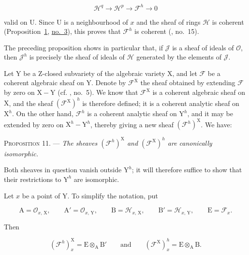 \begin{equation*}
\mathcal{H}^q\longrightarrow\mathcal{H}^p\longrightarrow\mathcal{F}^h\longrightarrow0
\end{equation*}

valid on $\mathrm{U}$. Since $\mathrm{U}$ is a neighbourhood of $x$ and the sheaf of rings $\mathcal{H}$ is coherent (Proposition~\hyperref[gaga:prop:1]{1}, \hyperref[gaga:no:3]{no.~3}), this proves that $\mathcal{F}^h$ is coherent (, no.~15).

The preceding proposition shows in particular that, if $\mathcal{J}$ is a sheaf of ideals of $\mathcal{O}$, then $\mathcal{J}^h$ is precisely the sheaf of ideals of $\mathcal{H}$ generated by the elements of $\mathcal{J}$.


Let $\mathrm{Y}$ be a Z-closed subvariety of the algebraic variety $\mathrm{X}$, and let $\mathcal{F}$ be a coherent algebraic sheaf on $\mathrm{Y}$. Denote by $\mathcal{F}^\mathrm{X}$ the sheaf obtained by extending $\mathcal{F}$ by zero on $\mathrm{X}-\mathrm{Y}$ (cf. , no.~5). We know that $\mathcal{F}^\mathrm{X}$ is a coherent algebraic sheaf on $\mathrm{X}$, and the sheaf $(\mathcal{F}^\mathrm{X})^h$ is therefore defined; it is a coherent analytic sheaf on $\mathrm{X}^h$. On the other hand, $\mathcal{F}^h$ is a coherent analytic sheaf on $\mathrm{Y}^h$, and it may be extended by zero on $\mathrm{X}^h-\mathrm{Y}^h$, thereby giving a new sheaf $(\mathcal{F}^h)^\mathrm{X}$. We have:

\textsc{Proposition 11}. --- \emph{The sheaves $(\mathcal{F}^h)^\mathrm{X}$ and $(\mathcal{F}^\mathrm{X})^h$ are canonically isomorphic.}

Both sheaves in question vanish outside $\mathrm{Y}^h$; it will therefore suffice to show that their restrictions to $\mathrm{Y}^h$ are isomorphic.

Let $x$ be a point of $\mathrm{Y}$. To simplify the notation, put

\begin{equation*}
\mathrm{A}=\mathcal{O}_{x,\,\mathrm{X}},\qquad \mathrm{A}'=\mathcal{O}_{x,\,\mathrm{Y}},\qquad
\mathrm{B}=\mathcal{H}_{x,\,\mathrm{X}},\qquad \mathrm{B}'=\mathcal{H}_{x,\,\mathrm{Y}},\qquad \mathrm{E}=\mathcal{F}_x.
\end{equation*}

Then

\begin{equation*}
(\mathcal{F}^h)^\mathrm{X}_x=\mathrm{E}\otimes_\mathrm{A}\mathrm{B}'
\qquad\text{and}\qquad
(\mathcal{F}^\mathrm{X})^h_x=\mathrm{E}\otimes_\mathrm{A}\mathrm{B}.
\end{equation*}

